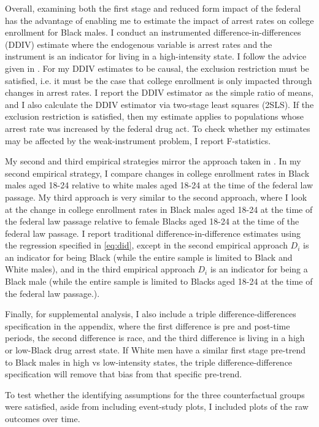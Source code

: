 \documentclass{article}
\begin{document}
Overall, examining both the first stage and reduced form impact of the federal has the advantage of enabling me to estimate the impact of arrest rates on college enrollment for Black males. I conduct an instrumented difference-in-differences (DDIV) estimate where the endogenous variable is arrest rates and the instrument is an indicator for living in a high-intensity state. I follow the advice given in \cite{ddiv}. For my DDIV estimates to be causal, the exclusion restriction must be satisfied, i.e. it must be the case that college enrollment is only impacted through changes in arrest rates.  I report the DDIV estimator as the simple ratio of means, and I also calculate the DDIV estimator via two-stage least squares (2SLS). If the exclusion restriction is satisfied, then my estimate applies to populations whose arrest rate was increased by the federal drug act. To check whether my estimates may be affected by the weak-instrument problem, I report F-statistics.

My second and third empirical strategies mirror the approach taken in \cite {britton2022}. In my second empirical strategy, I compare changes in college enrollment rates in Black males aged 18-24 relative to white males aged 18-24 at the time of the federal law passage. My third approach is very similar to the second approach, where I look at the change in college enrollment rates in Black males aged 18-24 at the time of the federal law passage relative to female Blacks aged 18-24 at the time of the federal law passage. I report traditional difference-in-difference estimates using the regression specified in \ref{eq:did}, except in the second empirical approach $D_i$ is an indicator for being Black (while the entire sample is limited to Black and White males), and in the third empirical approach $D_i$ is an indicator for being a Black male (while the entire sample is limited to Blacks aged 18-24 at the time of the federal law passage.).

Finally, for supplemental analysis, I also include a triple difference-differences specification in the appendix, where the first difference is pre and post-time periods, the second difference is race, and the third difference is living in a high or low-Black drug arrest state. If White men have a similar first stage pre-trend to Black males in high vs low-intensity states, the triple difference-difference specification will remove that bias from that specific pre-trend.

To test whether the identifying assumptions for the three counterfactual groups were satisfied, aside from including event-study plots, I included plots of the raw outcomes over time.
\end{document}
